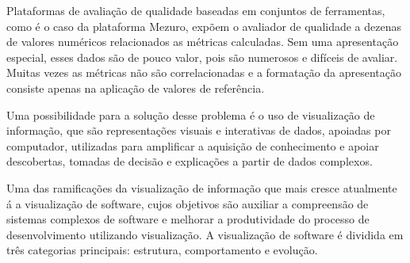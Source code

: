 Plataformas de avaliação de qualidade baseadas em conjuntos de ferramentas, como é o caso da plataforma Mezuro, expõem o avaliador de qualidade a dezenas de valores numéricos relacionados as métricas calculadas. Sem uma apresentação especial, esses dados são de pouco valor, pois são numerosos e difíceis de avaliar. Muitas vezes as métricas não são correlacionadas e a formatação da apresentação consiste apenas na aplicação de valores de referência.

Uma possibilidade para a solução desse problema é o uso de visualização de informação, que são representações visuais e interativas de dados, apoiadas por computador, utilizadas para amplificar a aquisição de conhecimento e apoiar descobertas, tomadas de decisão e explicações a partir de dados complexos.

Uma das ramificações da visualização de informação que mais cresce atualmente á a visualização de software, cujos objetivos são auxiliar a compreensão de sistemas complexos de software e melhorar a produtividade do processo de desenvolvimento utilizando visualização. A visualização de software é dividida em três categorias principais: estrutura, comportamento e evolução.


